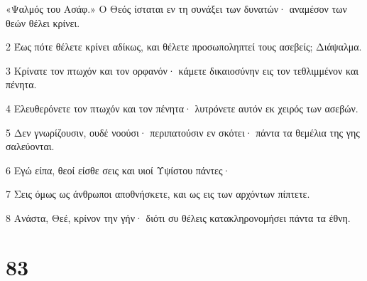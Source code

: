 \par «Ψαλμός του Ασάφ.» Ο Θεός ίσταται εν τη συνάξει των δυνατών· αναμέσον των θεών θέλει κρίνει.
\par 2 Έως πότε θέλετε κρίνει αδίκως, και θέλετε προσωποληπτεί τους ασεβείς; Διάψαλμα.
\par 3 Κρίνατε τον πτωχόν και τον ορφανόν· κάμετε δικαιοσύνην εις τον τεθλιμμένον και πένητα.
\par 4 Ελευθερόνετε τον πτωχόν και τον πένητα· λυτρόνετε αυτόν εκ χειρός των ασεβών.
\par 5 Δεν γνωρίζουσιν, ουδέ νοούσι· περιπατούσιν εν σκότει· πάντα τα θεμέλια της γης σαλεύονται.
\par 6 Εγώ είπα, θεοί είσθε σεις και υιοί Υψίστου πάντες·
\par 7 Σεις όμως ως άνθρωποι αποθνήσκετε, και ως εις των αρχόντων πίπτετε.
\par 8 Ανάστα, Θεέ, κρίνον την γήν· διότι συ θέλεις κατακληρονομήσει πάντα τα έθνη.

\chapter{83}

